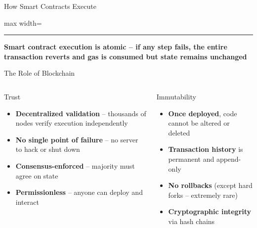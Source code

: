 \documentclass[8pt,aspectratio=169]{beamer}
\newcommand{\bottomnote}[1]{\vfill\vspace{-2mm}\textcolor{mllavender2}{\rule{\textwidth}{0.4pt}}\vspace{1mm}\footnotesize\textbf{#1}}
\begin{document}
\begin{frame}{How Smart Contracts Execute}
\begin{adjustbox}{max width=\textwidth}
\end{adjustbox}
\bottomnote{Smart contract execution is atomic -- if any step fails, the entire transaction reverts and gas is consumed but state remains unchanged}
\end{frame}

\begin{frame}{The Role of Blockchain}
\begin{columns}[T]
\begin{block}{\textcolor{mlblue}{Trust}}
\footnotesize
\begin{itemize}
  \item \textbf{Decentralized validation} -- thousands of nodes verify execution independently
  \item \textbf{No single point of failure} -- no server to hack or shut down
  \item \textbf{Consensus-enforced} -- majority must agree on state
  \item \textbf{Permissionless} -- anyone can deploy and interact
\end{itemize}
\end{block}

\begin{block}{\textcolor{mlgreen}{Immutability}}
\footnotesize
\begin{itemize}
  \item \textbf{Once deployed}, code cannot be altered or deleted
  \item \textbf{Transaction history} is permanent and append-only
  \item \textbf{No rollbacks} (except hard forks -- extremely rare)
  \item \textbf{Cryptographic integrity} via hash chains
\end{itemize}
\end{block}


\end{columns}
\end{frame}
\end{document}
